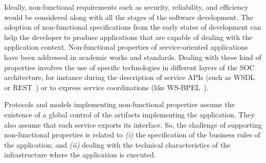 Ideally, non-functional requirements such as
security, reliability, and efficiency
would be considered along with all the stages of the software development. The
adoption of non-functional specifications from the early states of development
can help the developer to produce applications that are capable of dealing with
the application context.
%
%
Non-functional properties of service-oriented applications  have been
addressed in academic works and standards.%
Dealing with these kind of properties involves the use of specific technologies
in different layers of the SOC architecture, for instance during the description
of service APIs (such as WSDL\cite{wsdl} or REST~\cite{rest}) or to express
service coordinations (like WS-BPEL~\cite{bpel03}).


Protocols and models implementing non-functional properties assume the existence of a global control of the artifacts implementing the application.
They also assume that each service exports its interface.
So, the challenge of supporting non-functional properties is related to
\textit{(i)} the specification of the business rules of the application; and 
\textit{(ii)} dealing with the technical characteristics of the infrastructure where the application is executed.

